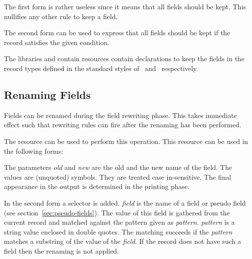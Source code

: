 \documentclass[11pt,a4paper]{scrbook}
\begin{document}
\begin{Resources}
\end{Resources}

The first form is rather useless since it means that all fields should be
kept. This nullifies any other rule to keep a field.

The second form can be used to express that all fields should be kept if the
record satisfies the given condition.

The libraries  and   contain
 resources contain declarations to keep the fields in the
record types defined in the standard styles of \BibTeX\ and \bibLaTeX\
respectively.

\subsection{Renaming Fields}

Fields can be renamed during the field rewriting phase. This takes immediate
effect such that rewriting rules can fire after the renaming has been
performed.

The resource  can be used to perform this operation. This
resource can be used in the following forms:

\begin{Resources}
\end{Resources}

The parameters \textit{old} and \textit{new} are the old and the new name of
the field. The values are (unquoted) symbols. They are treated case
in-sensitive. The final appearance in the output is determined in the printing
phase.

In the second form a selector is added. \textit{field} is the name of a field
or pseudo field (see section~\ref{sec:pseudo-fields}). The value of this field
is gathered from the current record and matched against the pattern given as
\textit{pattern}. \textit{pattern} is a string value enclosed in double quotes.
The matching succeeds if the \textit{pattern} matches a substring of the value
of the \textit{field}. If the record does not have such a field then the
renaming is not applied. 
\end{document}
